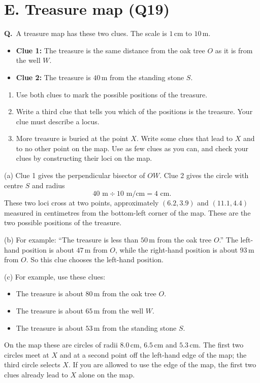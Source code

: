 \documentclass[12pt,a4paper]{article}
\newcounter{sol}
\newcommand{\s}{\refstepcounter{sol}\textbf{Q\thesol.}\ }
\begin{document}
\newpage

\section*{E. Treasure map (Q19)}

\s A treasure map has these two clues. The scale is \(1\)\,cm to \(10\)\,m.
\begin{itemize}
  \item \textbf{Clue 1:} The treasure is the same distance from the oak tree \(O\) as it is from the well \(W\).
  \item \textbf{Clue 2:} The treasure is \(40\)\,m from the standing stone \(S\).
\end{itemize}
\begin{enumerate}
  \item Use both clues to mark the possible positions of the treasure.
  \item Write a third clue that tells you which of the positions is the treasure. Your clue must describe a locus.
  \item More treasure is buried at the point \(X\). Write some clues that lead to \(X\) and to no other point on the map. Use as few clues as you can, and check your clues by constructing their loci on the map.
\end{enumerate}

\begin{solbox}
(a) Clue 1 gives the perpendicular bisector of \(OW\). Clue 2 gives the circle with centre \(S\) and radius
\[
40\text{ m}\div 10\text{ m/cm}=4\text{ cm}.
\]
These two loci cross at two points, approximately \((6.2,3.9)\) and \((11.1,4.4)\) measured in centimetres from the bottom-left corner of the map. These are the two possible positions of the treasure.

(b) For example: ``The treasure is less than \(50\)\,m from the oak tree \(O\).'' The left-hand position is about \(47\)\,m from \(O\), while the right-hand position is about \(93\)\,m from \(O\). So this clue chooses the left-hand position.

(c) For example, use these clues:
\begin{itemize}
  \item The treasure is about \(80\)\,m from the oak tree \(O\).
  \item The treasure is about \(65\)\,m from the well \(W\).
  \item The treasure is about \(53\)\,m from the standing stone \(S\).
\end{itemize}
On the map these are circles of radii \(8.0\)\,cm, \(6.5\)\,cm and \(5.3\)\,cm. The first two circles meet at \(X\) and at a second point off the left-hand edge of the map; the third circle selects \(X\). If you are allowed to use the edge of the map, the first two clues already lead to \(X\) alone on the map.
\end{solbox}
\end{document}
